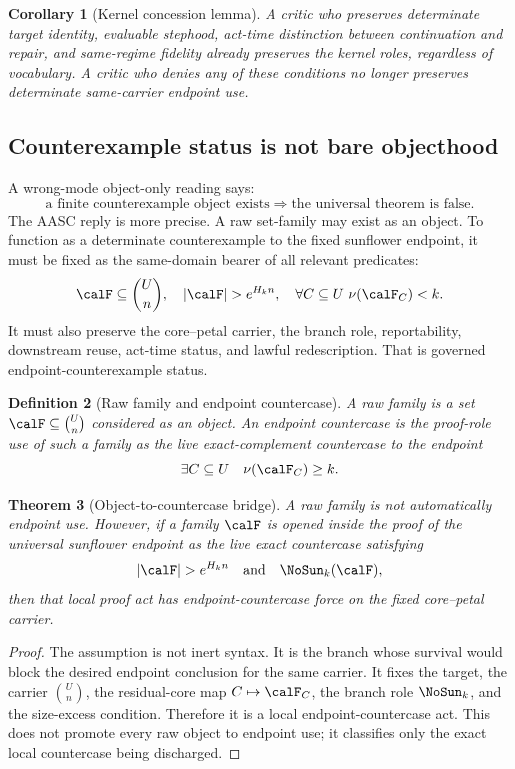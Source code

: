 \documentclass[11pt]{article}
\newtheorem{theorem}{Theorem}[section]
\newtheorem{corollary}[theorem]{Corollary}
\newtheorem{definition}[theorem]{Definition}
\begin{document}
\begin{corollary}[Kernel concession lemma]\label{cor:kernel-concession}
A critic who preserves determinate target identity, evaluable stephood, act-time distinction between continuation and repair, and same-regime fidelity already preserves the kernel roles, regardless of vocabulary.  A critic who denies any of these conditions no longer preserves determinate same-carrier endpoint use.
\end{corollary}

\subsection{Counterexample status is not bare objecthood}

A wrong-mode object-only reading says:
\[
  \text{a finite counterexample object exists}\Rightarrow \text{the universal theorem is false}.
\]
The AASC reply is more precise.  A raw set-family may exist as an object.  To function as a determinate counterexample to the fixed sunflower endpoint, it must be fixed as the same-domain bearer of all relevant predicates:
\[
  \calF\subseteq\binom{U}{n},\quad |\calF|>e^{H_k n},\quad
  \forall C\subseteq U\ \nu(\calF_C)<k.
\]
It must also preserve the core--petal carrier, the branch role, reportability, downstream reuse, act-time status, and lawful redescription.  That is governed endpoint-counterexample status.

\begin{definition}[Raw family and endpoint countercase]
A \emph{raw family} is a set \(\calF\subseteq\binom{U}{n}\) considered as an object.  An \emph{endpoint countercase} is the proof-role use of such a family as the live exact-complement countercase to the endpoint
\[
  \exists C\subseteq U\quad \nu(\calF_C)\ge k.
\]
\end{definition}

\begin{theorem}[Object-to-countercase bridge]\label{thm:object-countercase}
A raw family is not automatically endpoint use.  However, if a family \(\calF\) is opened inside the proof of the universal sunflower endpoint as the live exact countercase satisfying
\[
  |\calF|>e^{H_k n}\quad\text{and}\quad \NoSun_k(\calF),
\]
then that local proof act has endpoint-countercase force on the fixed core--petal carrier.
\end{theorem}

\begin{proof}
The assumption is not inert syntax.  It is the branch whose survival would block the desired endpoint conclusion for the same carrier.  It fixes the target, the carrier \(\binom{U}{n}\), the residual-core map \(C\mapsto\calF_C\), the branch role \(\NoSun_k\), and the size-excess condition.  Therefore it is a local endpoint-countercase act.  This does not promote every raw object to endpoint use; it classifies only the exact local countercase being discharged.
\end{proof}
\end{document}
